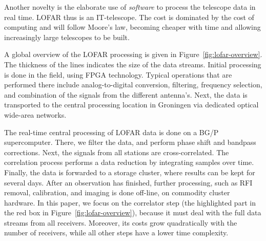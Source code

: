 \documentclass{article}
\newcommand{\longversion}[1]{}
\begin{document}
Another novelty is the elaborate
use of \emph{software\/} to process the telescope data in real time.
LOFAR thus is an IT-telescope. 
The cost
is dominated by the cost of computing and will follow Moore's law,
becoming cheaper with time and allowing increasingly large telescopes
to be built. 
\longversion{
LOFAR will enable exciting new science cases.  First, we expect to see
the \emph{Epoch of Reionization\/} (EoR), the time that the first star
galaxies and quasars were formed. Second, LOFAR offers a unique
possibility in particle astrophysics for studying the origin of
high-energy \emph{cosmic rays}.  Third, LOFAR's ability to
continuously monitor a large fraction of the sky makes it uniquely
suited to find new \emph{pulsars} and to study \emph{transient
  sources}.  Since LOFAR has no moving parts, it can instantaneously
switch focus to some galactic event.  Fourth, \emph{Deep Extragalactic
  Surveys\/} will be carried out to find the most distant radio
galaxies and study star-forming galaxies.  Fifth, LOFAR will be
capable of observing the so far unexplored radio waves emitted by
\emph{cosmic magnetic fields}.  For a more extensive description of
the astronomical aspects of the LOFAR system, see De Bruyn
et.~al.~\cite{Bruyn:02}.
}
A global overview of the LOFAR processing is given in
Figure~\ref{fig:lofar-overview}. The thickness of the lines indicates
the size of the data streams.  Initial processing is done in the
field, using FPGA technology.  Typical operations that are performed
there include analog-to-digital conversion, filtering, frequency
selection, and combination of the signals from the different
antenna's.  Next, the data is transported to the central processing
location in Groningen via dedicated optical wide-area networks.

The real-time central processing of LOFAR data is done on
a BG/P supercomputer.  There, we filter the data, and
perform phase shift and bandpass corrections.
Next, the signals from all stations are cross-correlated.  The
correlation process performs a data reduction by integrating samples
over time.  Finally, the data is forwarded to a storage cluster, where
results can be kept for several days.  After an observation has
finished, further processing, such as RFI removal, calibration, and imaging is done off-line, on commodity cluster
hardware.  
In this paper, we focus on the correlator step (the
highlighted part in the red box in
Figure~\ref{fig:lofar-overview}), because it must deal with the
full data streams from all receivers. Moreover, its costs grow
quadratically with the number of receivers, while all other steps have
a lower time complexity.
\end{document}
